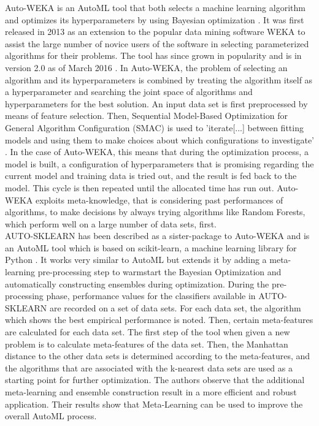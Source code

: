 \documentclass[12pt]{scrartcl}
\begin{document}
Auto-WEKA is an AutoML tool that both selects a machine learning algorithm and optimizes its hyperparameters by using Bayesian optimization \cite{thornton2013auto}. It was first released in 2013 as an extension to the popular data mining software WEKA \cite{hall2009weka} to assist the large number of novice users of the software in selecting parameterized algorithms for their problems. The tool has since grown in popularity and is in version 2.0 as of March 2016 \cite{kotthoff2016auto}. In Auto-WEKA, the problem of selecting an algorithm and its hyperparameters is combined by treating the algorithm itself as a hyperparameter and searching the joint space of algorithms and hyperparameters for the best solution. An input data set is first preprocessed by means of feature selection. Then, Sequential Model-Based Optimization for General Algorithm Configuration (SMAC) is used to 'iterate[...] between fitting models and using them to make choices about which configurations to investigate' \cite{hutter2011sequential}. In the case of Auto-WEKA, this means that during the optimization process, a model is built, a configuration of hyperparameters that is promising regarding the current model and training data is tried out, and the result is fed back to the model. This cycle is then repeated until the allocated time has run out. Auto-WEKA exploits meta-knowledge, that is considering past performances of algorithms, to make decisions by always trying algorithms like Random Forests, which perform well on a large number of data sets, first. \\

AUTO-SKLEARN has been described as a sister-package to Auto-WEKA and is an AutoML tool which is based on scikit-learn, a machine learning library for Python \cite{feurer2015efficient}. It works very similar to AutoML but extends it by adding a meta-learning pre-processing step to warmstart the Bayesian Optimization and automatically constructing ensembles during optimization. During the pre-processing phase, performance values for the classifiers available in AUTO-SKLEARN are recorded on a set of data sets. For each data set, the algorithm which shows the best empirical performance is noted. Then, certain meta-features are calculated for each data set. The first step of the tool when given a new problem is to calculate meta-features of the data set. Then, the Manhattan distance to the other data sets is determined according to the meta-features, and the algorithms that are associated with the k-nearest data sets are used as a starting point for further optimization. The authors observe that the additional meta-learning and ensemble construction result in a more efficient and robust application. Their results show that Meta-Learning can be used to improve the overall AutoML process.\\
\end{document}
